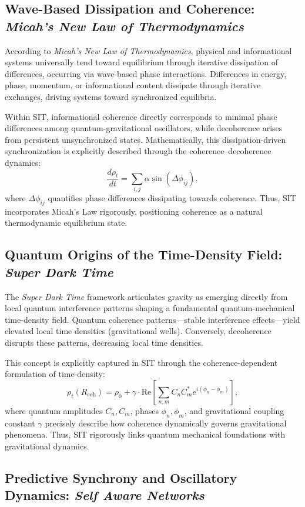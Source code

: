 \subsection{Wave-Based Dissipation and Coherence: \textit{Micah's New Law of Thermodynamics}}

According to \textit{Micah's New Law of Thermodynamics}, physical and informational systems universally tend toward equilibrium through iterative dissipation of differences, occurring via wave-based phase interactions. Differences in energy, phase, momentum, or informational content dissipate through iterative exchanges, driving systems toward synchronized equilibria.

Within SIT, informational coherence directly corresponds to minimal phase differences among quantum-gravitational oscillators, while decoherence arises from persistent unsynchronized states. Mathematically, this dissipation-driven synchronization is explicitly described through the coherence--decoherence dynamics:
\[
\frac{d\rho_t}{dt} = \sum_{i,j}\alpha \sin(\Delta\phi_{ij}),
\]
where \(\Delta\phi_{ij}\) quantifies phase differences dissipating towards coherence. Thus, SIT incorporates Micah's Law rigorously, positioning coherence as a natural thermodynamic equilibrium state.

\subsection{Quantum Origins of the Time-Density Field: \textit{Super Dark Time}}

The \textit{Super Dark Time} framework articulates gravity as emerging directly from local quantum interference patterns shaping a fundamental quantum-mechanical time-density field. Quantum coherence patterns---stable interference effects---yield elevated local time densities (gravitational wells). Conversely, decoherence disrupts these patterns, decreasing local time densities.

This concept is explicitly captured in SIT through the coherence-dependent formulation of time-density:
\[
\rho_t(R_{\mathrm{coh}}) = \rho_0 + \gamma \cdot \mathrm{Re}\left[\sum_{n,m} C_n C_m^* e^{i(\phi_n - \phi_m)}\right],
\]
where quantum amplitudes \(C_n, C_m\), phases \(\phi_n, \phi_m\), and gravitational coupling constant \(\gamma\) precisely describe how coherence dynamically governs gravitational phenomena. Thus, SIT rigorously links quantum mechanical foundations with gravitational dynamics.

\subsection{Predictive Synchrony and Oscillatory Dynamics: \textit{Self Aware Networks}}

